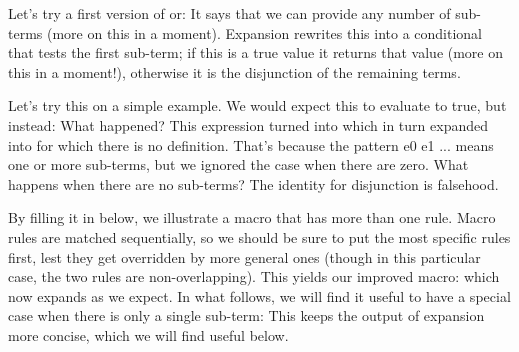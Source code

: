 
Let’s try a first version of or:
It says that we can provide any number of sub-terms (more on this in a moment).
Expansion rewrites this into a conditional that tests the first sub-term; if
this is a true value it returns that value (more on this in a moment!),
otherwise it is the disjunction of the remaining terms.

Let’s try this on a simple example. We would expect this to evaluate to true,
but instead:
What happened? This expression turned into
which in turn expanded into
for which there is no definition. That’s because the pattern e0 e1 ... means one
or more sub-terms, but we ignored the case when there are zero. What happens
when there are no sub-terms? The identity for disjunction is falsehood.


By filling it in below, we illustrate a macro that has more than one rule. Macro
rules are matched sequentially, so we should be sure to put the most specific
rules first, lest they get overridden by more general ones (though in this
particular case, the two rules are non-overlapping). This yields our improved
macro:
which now expands as we expect. In what follows, we will find it useful to have
a special case when there is only a single sub-term:
This keeps the output of expansion more concise, which we will find useful
below.

